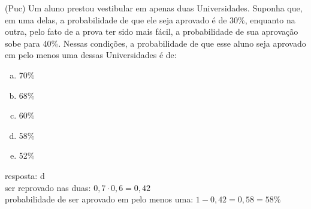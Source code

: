 \begin{ex}
  (Puc) Um aluno prestou vestibular em apenas duas Universidades. Suponha que, em uma delas, a probabilidade de que ele seja aprovado é de 30\%, enquanto na outra, pelo fato de a prova ter sido mais fácil, a probabilidade de sua aprovação sobe para 40\%. Nessas condições, a probabilidade de que esse aluno seja aprovado em pelo menos uma dessas Universidades é de:
     \begin{enumerate}  [(a)]
         \item 70\%
         \item 68\%
         \item 60\%
         \item 58\%
         \item 52\%
     \end{enumerate}
       \begin{sol}
        resposta: d \\
        ser reprovado nas duas: $0,7\cdot0,6=0,42$ \\
        probabilidade de ser aprovado em pelo menos uma: $1-0,42=0,58=58\%$
       \end{sol}
 \end{ex}